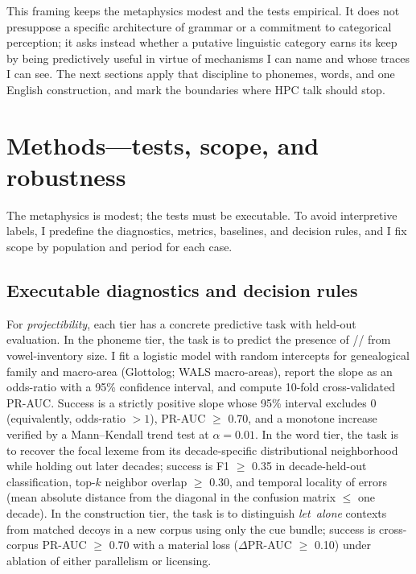 \documentclass[12pt]{article}
\begin{document}
This framing keeps the metaphysics modest and the tests empirical. It does not presuppose a specific architecture of grammar or a commitment to categorical perception; it asks instead whether a putative linguistic category earns its keep by being predictively useful in virtue of mechanisms I can name and whose traces I can see. The next sections apply that discipline to phonemes, words, and one English construction, and mark the boundaries where \textsc{HPC} talk should stop.


\section{Methods—tests, scope, and robustness}\label{sec:methods}

The metaphysics is modest; the tests must be executable. To avoid interpretive labels, I predefine the diagnostics, metrics, baselines, and decision rules, and I fix scope by population and period for each case.

\subsection*{Executable diagnostics and decision rules}

For \emph{projectibility}, each tier has a concrete predictive task with held-out evaluation. In the phoneme tier, the task is to predict the presence of // from vowel-inventory size. I fit a logistic model with random intercepts for genealogical family and macro-area (Glottolog; WALS macro-areas), report the slope as an odds-ratio with a 95\% confidence interval, and compute 10-fold cross-validated PR-AUC. Success is a strictly positive slope whose 95\% interval excludes 0 (equivalently, odds-ratio $>1$), PR-AUC $\ge$ 0.70, and a monotone increase verified by a Mann–Kendall trend test at $\alpha=0.01$. In the word tier, the task is to recover the focal lexeme from its decade-specific distributional neighborhood while holding out later decades; success is F1 $\ge$ 0.35 in decade-held-out classification, top-$k$ neighbor overlap $\ge$ 0.30, and temporal locality of errors (mean absolute distance from the diagonal in the confusion matrix $\leq$ one decade). In the construction tier, the task is to distinguish \emph{let~alone} contexts from matched decoys in a new corpus using only the cue bundle; success is cross-corpus PR-AUC $\ge$ 0.70 with a material loss ($\Delta$PR-AUC $\ge$ 0.10) under ablation of either parallelism or licensing.
\end{document}
